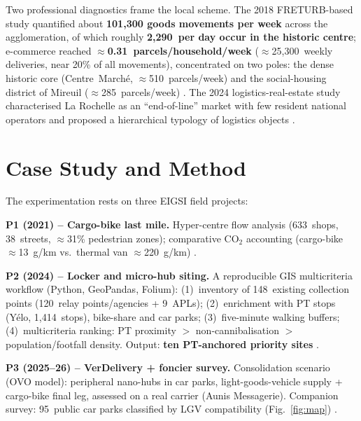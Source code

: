 \documentclass[10pt,a4paper,twocolumn]{article}
\begin{document}
Two professional diagnostics frame the local scheme. The 2018 FRETURB-based study
quantified about \textbf{101,300 goods movements per week} across the agglomeration,
of which roughly \textbf{2,290~per day occur in the historic centre}; e-commerce
reached $\approx$\textbf{0.31~parcels/household/week} ($\approx$25,300~weekly
deliveries, near 20\% of all movements), concentrated on two poles: the dense
historic core (Centre~Marché, $\approx$510~parcels/week) and the social-housing
district of Mireuil ($\approx$285~parcels/week) \citep{it2018}. The 2024
logistics-real-estate study characterised La Rochelle as an ``end-of-line'' market
with few resident national operators and proposed a hierarchical typology of
logistics objects \citep{it2024}.

\section{Case Study and Method}

The experimentation rests on three EIGSI field projects:

\textbf{P1 (2021) -- Cargo-bike last mile.} Hyper-centre flow analysis (633~shops,
38~streets, $\approx$31\% pedestrian zones); comparative CO$_2$ accounting
(cargo-bike $\approx$13~g/km vs.\ thermal van $\approx$220~g/km) \citep{eigsi2021}.

\textbf{P2 (2024) -- Locker and micro-hub siting.} A reproducible GIS
multicriteria workflow (Python, GeoPandas, Folium): (1)~inventory of
148~existing collection points (120~relay points/agencies + 9~APLs); (2)~enrichment
with PT stops (Yélo, 1,414~stops), bike-share and car parks; (3)~five-minute
walking buffers; (4)~multicriteria ranking: PT proximity $>$ non-cannibalisation $>$
population/footfall density. Output: \textbf{ten PT-anchored priority sites}
\citep{eigsi2024}.

\textbf{P3 (2025--26) -- VerDelivery + foncier survey.} Consolidation scenario
(OVO model): peripheral nano-hubs in car parks, light-goods-vehicle supply +
cargo-bike final leg, assessed on a real carrier (Aunis Messagerie). Companion
survey: 95~public car parks classified by LGV compatibility (Fig.~\ref{fig:map})
\citep{eigsi2026}.

\begin{figure}[h]
  \centering
  \label{fig:network}
\end{figure}
\end{document}
